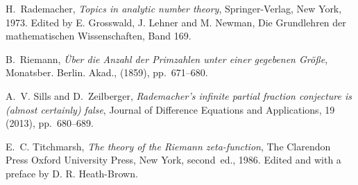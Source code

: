 \documentclass[a4paper]{amsart}
\begin{document}
\begin{thebibliography}{10}
  {\sc H.~Rademacher}, {\em Topics in analytic number theory}, Springer-Verlag,
    New York, 1973.
  \newblock Edited by E. Grosswald, J. Lehner and M. Newman, Die Grundlehren der
    mathematischen Wissenschaften, Band 169.
  
  {\sc B.~Riemann}, {\em {\"U}ber die {A}nzahl der {P}rimzahlen unter einer
    gegebenen {G}r{\"o}{\ss}e}, Monatsber. Berlin. Akad.,  (1859), pp.~671--680.
  
  {\sc A.~V. Sills and D.~Zeilberger}, {\em Rademacher's infinite partial
    fraction conjecture is (almost certainly) false}, Journal of Difference
    Equations and Applications, 19 (2013), pp.~680--689.
  
  {\sc E.~C. Titchmarsh}, {\em The theory of the {R}iemann zeta-function}, The
    Clarendon Press Oxford University Press, New York, second~ed., 1986.
  \newblock Edited and with a preface by D. R. Heath-Brown.
  
  \end{thebibliography}
  
\end{document}
